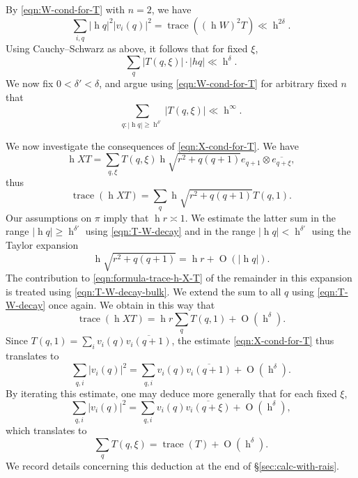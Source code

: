 \documentclass[reqno,10pt]{amsart}
\theoremstyle{plain} %
\theoremstyle{definition}
\theoremstyle{plain} %
\theoremstyle{remark}
\theoremstyle{itplain} %
\theoremstyle{remark} %
\renewcommand{\geq}{\geqslant}
\numberwithin{equation}{section}
\DeclareMathOperator{\trace}{trace}
\def\O{\operatorname{O}}
\DeclareMathOperator{\h}{h}
\begin{document}
By \eqref{eqn:W-cond-for-T} with $n = 2$, we have
\[
  \sum_{i,q} |\h q|^2 |v_i(q)|^2 = \trace((\h W)^2 T) \ll \h^{2 \delta}.
\]
Using Cauchy--Schwarz as above, it follows that for fixed $\xi$,
\begin{equation}\label{eqn:T-W-decay-bulk}
  \sum_q
  |T(q,\xi)| \cdot |h q|
  \ll
  \h^{\delta}.
\end{equation}
We now fix $0 < \delta ' < \delta$, and argue using \eqref{eqn:W-cond-for-T} for arbitrary fixed $n$ that
\begin{equation}\label{eqn:T-W-decay}
  \sum_{q :  |\h q| \geq \h^{\delta '}}
  |T(q,\xi)| \ll \h^\infty.
\end{equation}

We now investigate the consequences of \eqref{eqn:X-cond-for-T}.  We have
\[
  \h X T = \sum_{q,\xi} T(q,\xi) \h \sqrt{r^2 + q(q+1)} e_{q + 1} \otimes \overline{e_{q + \xi}},
\]
thus
\begin{equation}\label{eqn:formula-trace-h-X-T}
  \trace(\h X T) = \sum_{q} \h \sqrt{r^2 + q(q+1)} T(q,1).
\end{equation}
Our assumptions on $\pi$ imply that $\h r \asymp 1$.  We estimate the latter sum in the range $|\h q | \geq \h^{\delta '}$ using \eqref{eqn:T-W-decay} and in the range $|\h q | < \h ^{\delta '}$ using the Taylor expansion
\[
  \h \sqrt{r^2 + q(q+1)} = \h r + \O(|\h q|).
\]
The contribution to \eqref{eqn:formula-trace-h-X-T} of the remainder in this expansion is treated using \eqref{eqn:T-W-decay-bulk}.  We extend the sum to all $q$ using \eqref{eqn:T-W-decay} once again.  We obtain in this way that
\begin{equation*}
  \trace(\h X T) = \h {r} \sum_{q} T(q,1)
  + \O(\h^\delta).
\end{equation*}
Since $T(q,1) = \sum_i v_i(q) \overline{v_i(q+1)}$, the estimate \eqref{eqn:X-cond-for-T} thus translates to
\begin{equation}\label{eqn:X-cond-for-T-2}
  \sum_{q,i}
  |v_i(q)|^2 = \sum_{q,i} v_i(q) \overline{v_i(q+1)}
  + \O(\h^\delta).
\end{equation}
By iterating this estimate, one may deduce more generally that for each fixed $\xi$,
\begin{equation}\label{eqn:T-X-cons-0}
  \sum_{q,i}
  |v_i(q)|^2 = \sum_{q,i} v_i(q) \overline{v_i(q+\xi)}
  + \O(\h^\delta),
\end{equation}
which translates to
\begin{equation}\label{eqn:T-X-cons}
  \sum_q T(q,\xi) = \trace(T) + \O(\h^\delta).
\end{equation}
We record details concerning this deduction at the end of \S\ref{sec:calc-with-rais}. 
\end{document}
